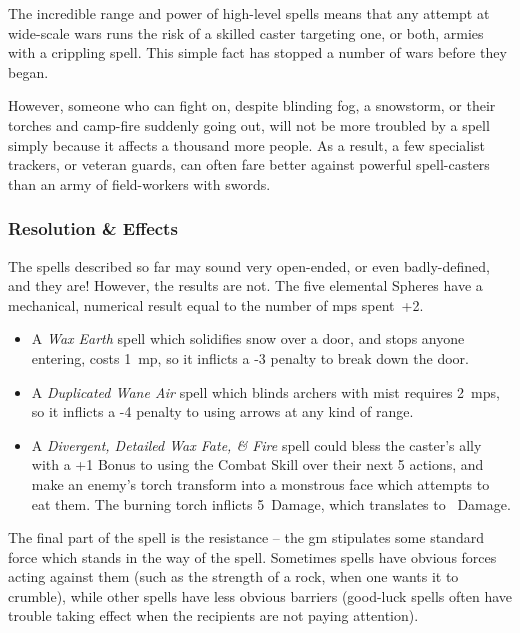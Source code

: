 \begin{multicols}{2}
\begin{exampletext}
  The incredible range and power of high-level spells means that any attempt at wide-scale wars runs the risk of a skilled caster targeting one, or both, armies with a crippling spell.
  This simple fact has stopped a number of wars before they began.

  However, someone who can fight on, despite blinding fog, a snowstorm, or their torches and camp-fire suddenly going out, will not be more troubled by a spell simply because it affects a thousand more people.
  As a result, a few specialist trackers, or veteran \glspl{guard}, can often fare better against powerful spell-casters than an army of field-workers with swords.
\end{exampletext}

\subsubsection{Resolution \& Effects}

The spells described so far may sound very open-ended, or even badly-defined, and they are!
However, the results are not.
The five elemental Spheres have a mechanical, numerical result equal to the number of \glspl{mp} spent~+2.

\begin{itemize}
  \item
  A \textit{Wax Earth} spell which solidifies snow over a door, and stops anyone entering, costs 1~\gls{mp}, so it inflicts a -3 penalty to break down the door.
  \item
  A \textit{Duplicated Wane Air} spell which blinds archers with mist requires 2~\glspl{mp}, so it inflicts a -4 penalty to using arrows at any kind of range.
  \item
  A \textit{Divergent, Detailed Wax Fate, \& Fire} spell could bless the caster's ally with a +1 Bonus to using the Combat Skill over their next 5 actions, and make an enemy's torch transform into a monstrous face which attempts to eat them.
  The burning torch inflicts 5~Damage, which translates to ~Damage.%
\end{itemize}

The final part of the spell is the resistance -- the \gls{gm} stipulates some standard force which stands in the way of the spell.
Sometimes spells have obvious forces acting against them (such as the strength of a rock, when one wants it to crumble), while other spells have less obvious barriers (good-luck spells often have trouble taking effect when the recipients are not paying attention).


\end{multicols}
